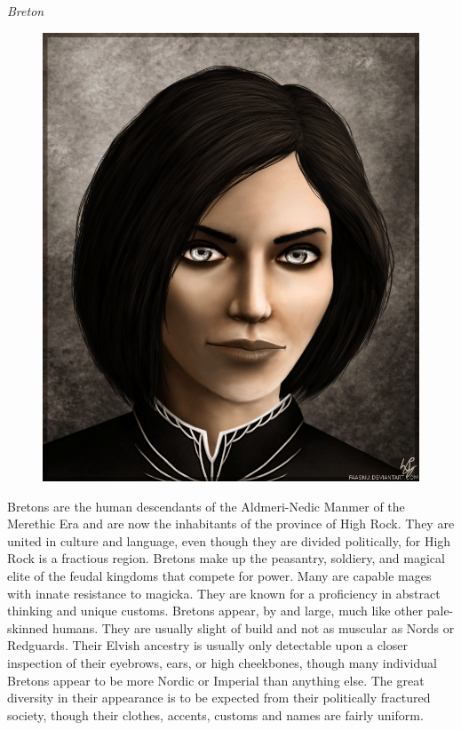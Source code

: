 \documentclass[12pt]{article}
\begin{document}
\noindent
\textit{Breton}
\begin{figure}
	\includegraphics[width=\textwidth]{Breton.png}
\end{figure}

Bretons are the human descendants of the Aldmeri-Nedic Manmer of the Merethic Era and are now the inhabitants of the province of High Rock. They are united in culture and language, even though they are divided politically, for High Rock is a fractious region. Bretons make up the peasantry, soldiery, and magical elite of the feudal kingdoms that compete for power. Many are capable mages with innate resistance to magicka. They are known for a proficiency in abstract thinking and unique customs. Bretons appear, by and large, much like other pale-skinned humans. They are usually slight of build and not as muscular as Nords or Redguards. Their Elvish ancestry is usually only detectable upon a closer inspection of their eyebrows, ears, or high cheekbones, though many individual Bretons appear to be more Nordic or Imperial than anything else. The great diversity in their appearance is to be expected from their politically fractured society, though their clothes, accents, customs and names are fairly uniform.
\end{document}

